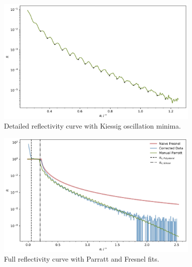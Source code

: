 \begin{figure}[H]
	\centering
	\includegraphics[width=0.88\textwidth]{content/plots/7.jpg}
	\caption{Detailed reflectivity curve with Kiessig oscillation minima.}
	\label{fig:kiessig-peaks}
\end{figure}

\begin{figure}[H]
	\centering
	\includegraphics[width=0.88\textwidth]{content/plots/8.jpg}
	\caption{Full reflectivity curve with Parratt and Fresnel fits.}
	\label{fig:parratt-fresnel}
\end{figure}
